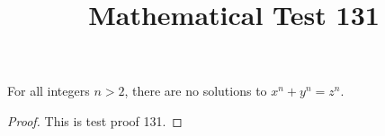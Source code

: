 \documentclass{amsart}
\begin{document}
\title{Mathematical Test 131}
\begin{theorem}
For all integers $n > 2$, there are no solutions to $x^n + y^n = z^n$.
\end{theorem}
\begin{proof}
This is test proof 131.
\end{proof}
\end{document}
